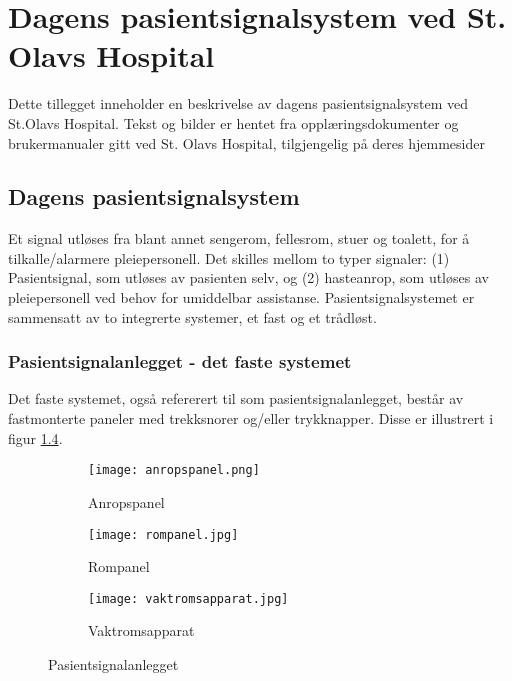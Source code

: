 \chapter{Dagens pasientsignalsystem ved St. Olavs Hospital}
\label{chp:appendix_dagenssystem}
Dette tillegget inneholder en beskrivelse av dagens pasientsignalsystem ved St.Olavs Hospital. Tekst og bilder er hentet fra opplæringsdokumenter og brukermanualer gitt ved St. Olavs Hospital, tilgjengelig på deres hjemmesider \cite{BrukerveiledningforPasientsignal, BrukermanualforPasientsignalogPasientsignalapplikasjon, BrukerveiledningforTradlostelefon}

\section{Dagens pasientsignalsystem}
Et signal utløses fra blant annet sengerom, fellesrom, stuer og toalett, for å tilkalle/alarmere pleiepersonell. Det skilles mellom to typer signaler: (1) Pasientsignal, som utløses av pasienten selv, og (2) hasteanrop, som utløses av pleiepersonell ved behov for umiddelbar assistanse. Pasientsignalsystemet er sammensatt av to integrerte systemer, et fast og et trådløst. 

\subsection{Pasientsignalanlegget - det faste systemet}
Det faste systemet, også refererert til som pasientsignalanlegget, består av fastmonterte paneler med trekksnorer og/eller trykknapper. Disse er illustrert i figur \ref{pasientsignalanlegget}.

\begin{figure}[H]
        \centering
        \begin{subfigure}[b]{0.3\textwidth}
        		\centering
                \texttt{[image: anropspanel.png]}
                \caption{Anropspanel}
                \label{anropspanel}
        \end{subfigure}%
        \begin{subfigure}[b]{0.3\textwidth}
        		\centering
                \texttt{[image: rompanel.jpg]}
                \caption{Rompanel}
                \label{rompanel}
        \end{subfigure}
        \begin{subfigure}[b]{0.3\textwidth}
        		\centering
                \texttt{[image: vaktromsapparat.jpg]}
                \caption{Vaktromsapparat}
                \label{vaktromsapparat}
        \end{subfigure}
        \caption{Pasientsignalanlegget}
        \label{pasientsignalanlegget}
\end{figure}


